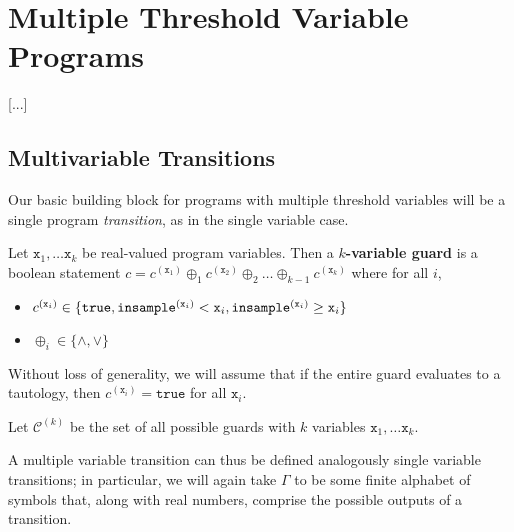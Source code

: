 
\section{Multiple Threshold Variable Programs}

[...]

\subsection{Multivariable Transitions}

Our basic building block for programs with multiple threshold variables will be a single program \textit{transition}, as in the single variable case. 

\begin{defn}
    Let $\texttt{x}_1, \ldots \texttt{x}_k$ be real-valued program variables. Then a \textbf{$k$-variable guard} is a boolean statement $c = c^{(\texttt{x}_1)}\oplus_1 c^{(\texttt{x}_2)}\oplus_2\ldots\oplus_{k-1}c^{(\texttt{x}_k)}$ where for all $i$, \begin{itemize}
        \item $c^{(\texttt{x}_i)}\in \{\texttt{true}, \mvlguard[\texttt{x}_i], \mvgguard[\texttt{x}_i]\}$
        \item $\oplus_i \in \{\land, \lor\}$
    \end{itemize}
    Without loss of generality, we will assume that if the entire guard evaluates to a tautology, then $c^{(\texttt{x}_i)}=\texttt{true}$ for all $\texttt{x}_i$. 
    
    

    Let $\mathcal{C}^{(k)}$ be the set of all possible guards with $k$ variables $\texttt{x}_1, \ldots \texttt{x}_k$.
\end{defn}


A multiple variable transition can thus be defined analogously single variable transitions; in particular, we will again take $\Gamma$ to be some finite alphabet of symbols that, along with real numbers, comprise the possible outputs of a transition. 

